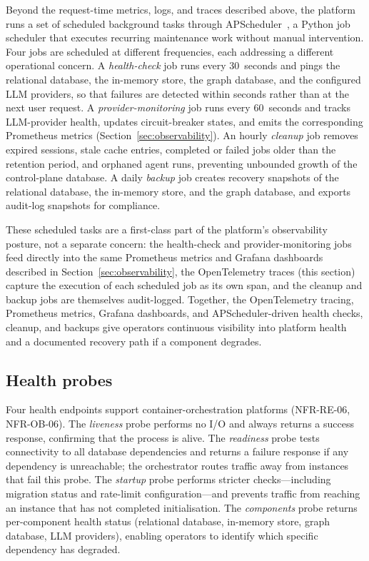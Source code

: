 \documentclass[a4paper,noexaminfo]{sapthesis}
\begin{document}
Beyond the request-time metrics, logs, and traces described above, the
platform runs a set of scheduled background tasks through
APScheduler~\cite{apscheduler2023}, a Python job scheduler that executes
recurring maintenance work without manual intervention.  Four jobs are
scheduled at different frequencies, each addressing a different
operational concern.  A \emph{health-check} job runs every 30~seconds and
pings the relational database, the in-memory store, the graph database,
and the configured LLM providers, so that failures are detected within
seconds rather than at the next user request.  A \emph{provider-monitoring}
job runs every 60~seconds and tracks LLM-provider health, updates circuit-breaker
states, and emits the corresponding Prometheus metrics
(Section~\ref{sec:observability}).  An hourly \emph{cleanup} job removes
expired sessions, stale cache entries, completed or failed jobs older than
the retention period, and orphaned agent runs, preventing unbounded growth
of the control-plane database.  A daily \emph{backup} job creates recovery
snapshots of the relational database, the in-memory store, and the graph
database, and exports audit-log snapshots for compliance.

These scheduled tasks are a first-class part of the platform's
observability posture, not a separate concern: the health-check and
provider-monitoring jobs feed directly into the same Prometheus metrics
and Grafana dashboards described in Section~\ref{sec:observability},
the OpenTelemetry traces (this section) capture the execution of each
scheduled job as its own span, and the cleanup and backup jobs are
themselves audit-logged.  Together, the OpenTelemetry tracing,
Prometheus metrics, Grafana dashboards, and APScheduler-driven health
checks, cleanup, and backups give operators continuous visibility into
platform health and a documented recovery path if a component degrades.

\subsection{Health probes}

Four health endpoints support container-orchestration platforms
(NFR-RE-06, NFR-OB-06).  The \emph{liveness} probe performs no I/O and
always returns a success response, confirming that the process is alive.
The \emph{readiness} probe tests connectivity to all database dependencies
and returns a failure response if any dependency is unreachable; the
orchestrator routes traffic away from instances that fail this probe.
The \emph{startup} probe performs stricter checks---including migration
status and rate-limit configuration---and prevents traffic from reaching
an instance that has not completed initialisation.  The \emph{components}
probe returns per-component health status (relational database, in-memory
store, graph database, LLM providers), enabling operators to identify
which specific dependency has degraded.
\end{document}
